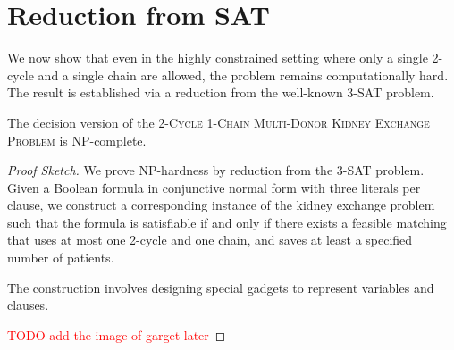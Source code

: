 \section{Reduction from SAT}

We now show that even in the highly constrained setting where only a single 2-cycle and a single chain are allowed, the problem remains computationally hard. The result is established via a reduction from the well-known \textsc{3-SAT} problem.

\begin{lemma}
The decision version of the \textsc{2-Cycle 1-Chain Multi-Donor Kidney Exchange Problem} is NP-complete.
\end{lemma}

\begin{proof}[Proof Sketch]
We prove NP-hardness by reduction from the \textsc{3-SAT} problem. Given a Boolean formula in conjunctive normal form with three literals per clause, we construct a corresponding instance of the kidney exchange problem such that the formula is satisfiable if and only if there exists a feasible matching that uses at most one 2-cycle and one chain, and saves at least a specified number of patients.

The construction involves designing special gadgets to represent variables and clauses. 

\textcolor{red}{TODO add the image of garget later}

\end{proof}



